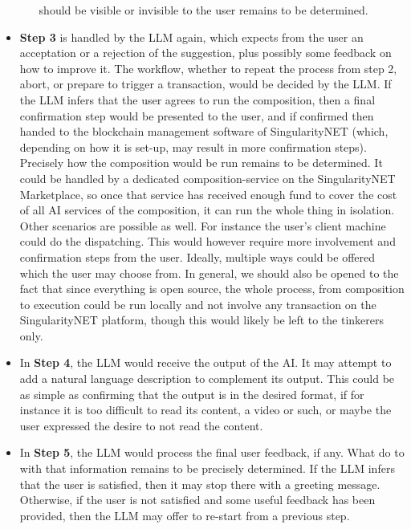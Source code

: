 \documentclass[]{article}
\begin{document}
\begin{itemize}
\begin{itemize}
    should be visible or invisible to the user remains to be
    determined.
  \end{itemize}
\item \textbf{Step 3} is handled by the LLM again, which expects from
  the user an acceptation or a rejection of the suggestion, plus
  possibly some feedback on how to improve it.  The workflow, whether
  to repeat the process from step 2, abort, or prepare to trigger a
  transaction, would be decided by the LLM.  If the LLM infers that
  the user agrees to run the composition, then a final confirmation
  step would be presented to the user, and if confirmed then handed to
  the blockchain management software of SingularityNET (which,
  depending on how it is set-up, may result in more confirmation
  steps).  Precisely how the composition would be run remains to be
  determined.  It could be handled by a dedicated composition-service
  on the SingularityNET Marketplace, so once that service has received
  enough fund to cover the cost of all AI services of the composition,
  it can run the whole thing in isolation.  Other scenarios are
  possible as well.  For instance the user's client machine could do
  the dispatching.  This would however require more involvement and
  confirmation steps from the user.  Ideally, multiple ways could be
  offered which the user may choose from.  In general, we should also
  be opened to the fact that since everything is open source, the
  whole process, from composition to execution could be run locally
  and not involve any transaction on the SingularityNET platform,
  though this would likely be left to the tinkerers only.
\item In \textbf{Step 4}, the LLM would receive the output of the AI.
  It may attempt to add a natural language description to complement
  its output.  This could be as simple as confirming that the output
  is in the desired format, if for instance it is too difficult to
  read its content, a video or such, or maybe the user expressed the
  desire to not read the content.
\item In \textbf{Step 5}, the LLM would process the final user
  feedback, if any.  What do to with that information remains to be
  precisely determined.  If the LLM infers that the user is satisfied,
  then it may stop there with a greeting message.  Otherwise, if the
  user is not satisfied and some useful feedback has been provided,
  then the LLM may offer to re-start from a previous step.
\end{itemize}
\end{document}
